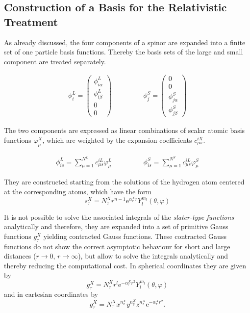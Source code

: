 \subsection{Construction of a Basis for the Relativistic Treatment}\label{basis}
As already discussed, the four components of a spinor are expanded into a finite
set of one particle basis functions. Thereby the basis sets of the large and small
component are treated separately.

\begin{equation}\begin{array}{ccc}
\phi_i^L = \begin{pmatrix}\phi^L_{i\alpha}\\\phi^L_{i\beta}\\0\\0\end{pmatrix} &\hspace{3em} &\phi_j^S = \begin{pmatrix}0\\0\\\phi^S_{j\alpha}\\\phi^S_{j\beta}\end{pmatrix}
\end{array}\end{equation}

The two components are expressed as linear combinations of scalar atomic
basis functions $\varphi_\mu^X$, which are weighted by the expansion coefficients
$c_{\mu s}^{iX}$.

\begin{equation}\begin{array}{ccc}
\phi^L_{is} = \sum\limits_{\mu=1}^{N^L} c_{\mu s}^{iL} \varphi_\mu^L &\hspace{3em}& \phi^S_{is} = \sum\limits_{\mu=1}^{N^S} c_{\mu s}^{iL} \varphi_\mu^S
\end{array}\end{equation}

They are constructed starting from the solutions of the hydrogen atom centered
at the corresponding atoms, which have the form
\begin{equation}
s_\tau^X = N_\tau^X r^{n-1}\mathrm{e}^{\alpha_\tau^X r}Y_l^{m_l}(\theta,\varphi)
\end{equation}

It is not possible to solve the associated integrals of the \emph{slater-type
functions} analytically and therefore, they are expanded into a set of primitive
Gauss functions $g_\tau^X$ yielding contracted Gauss functions.
These contracted Gauss functions do not show the correct asymptotic behaviour for
short and large distances ($r\rightarrow 0$, $r\rightarrow\infty$), but allow to
solve the integrals analytically and thereby reducing the computational cost.
In spherical coordinates they are given by
\begin{equation}
g_\tau^X = N_\tau^Xr^l\mathrm{e}^{-\alpha_\tau^Xr^2}Y_l^{m_l}(\theta,\varphi)
\end{equation}
and in cartesian coordinates by
\begin{equation}
g_\tau^X = N_\tau^X x^{n_x^X}y^{n_y^X}z^{n_z^X} \mathrm{e}^{-\alpha_\tau^Xr^2}.
\end{equation}

